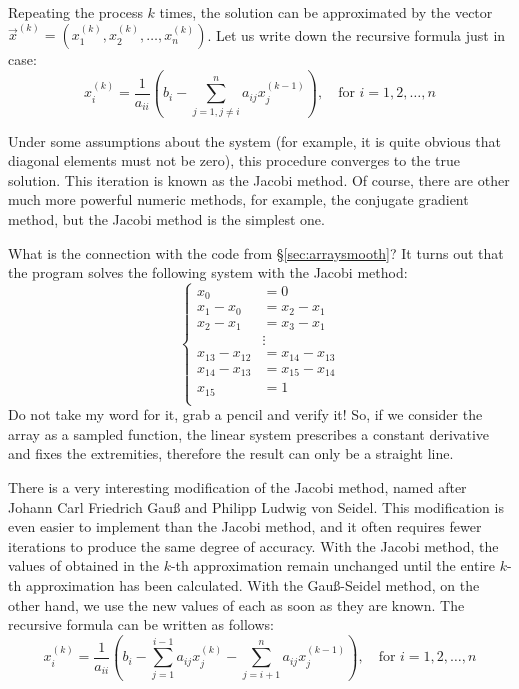 \documentclass[notitlepage,oneside]{book}
\begin{document}
Repeating the process $k$ times, the solution can be approximated by the vector $\vec{x}^{(k)}=\left(x_1^{(k)}, x_2^{(k)}, \dots, x_n^{(k)}\right)$.
Let us write down the recursive formula just in case:
$$
x_i^{(k)} = \frac{1}{a_{ii}} \left(b_i - \sum\limits_{j=1,j\neq i}^n a_{ij}x_j^{(k-1)} \right), \quad \text{for } i=1,2,\dots,n
$$

Under some assumptions about the system (for example, it is quite obvious that diagonal elements must not be zero), this procedure converges to the true solution.
This iteration is known as the Jacobi method.
Of course, there are other much more powerful numeric methods, for example, the conjugate gradient method, but the Jacobi method is the simplest one.

What is the connection with the code from \S\ref{sec:arraysmooth}? It turns out that the program solves the following system with the Jacobi method:
\begin{equation}
\label{eq:1d:smooth}
\left\{
\begin{array}{rl}
 x_0 &= 0 \\
x_1-x_0 &= x_2-x_1 \\
x_2-x_1 &= x_3-x_1 \\
     &  \vdots \\
x_{13}-x_{12}     &= x_{14}-x_{13} \\
x_{14}-x_{13}     &= x_{15}-x_{14} \\
x_{15} &= 1 \\
\end{array}
\right.
\end{equation}
Do not take my word for it, grab a pencil and verify it!
So, if we consider the array as a sampled function, the linear system prescribes a constant derivative and fixes the extremities, therefore the result can only be a straight line.

There is a very interesting modification of the Jacobi method, named after Johann Carl Friedrich Gauß and Philipp Ludwig von Seidel.
This modification is even easier to implement than the Jacobi method, and it often requires fewer iterations to produce the same degree of accuracy.
With the Jacobi method, the values of obtained in the $k$-th approximation remain unchanged until the entire
$k$-th approximation has been calculated. With the Gauß-Seidel method, on the other hand, we use the new values of each as soon as they are known.
The recursive formula can be written as follows:
$$
x_i^{(k)} = \frac{1}{a_{ii}} \left(b_i - \sum\limits_{j=1}^{i-1} a_{ij}x_j^{(k)} -  \sum\limits_{j=i+1}^n a_{ij}x_j^{(k-1)} \right), \quad \text{for } i=1,2,\dots,n
$$
\end{document}
